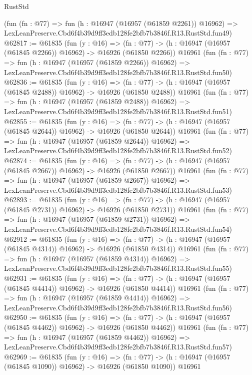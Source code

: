 \begin{lexlean}{RustStd}
\begin{coremodule}
    (fun (fn : @77) =>
    fun (h : @16947 (@16957 (@61859 @2261)) @16962) =>
    LexLeanPreserve.Cbd6f4b39d9ff3edb128fe2bfb7b3846f.R13.RustStd.fun49)
@62817 := @61835
    (fun (y : @16) =>
    (fn : @77) -> (h : @16947 (@16957 (@61845 @2266)) @16962) -> @16926 (@61850 @2266))
    @16961
    (fun (fn : @77) =>
    fun (h : @16947 (@16957 (@61859 @2266)) @16962) =>
    LexLeanPreserve.Cbd6f4b39d9ff3edb128fe2bfb7b3846f.R13.RustStd.fun50)
@62836 := @61835
    (fun (y : @16) =>
    (fn : @77) -> (h : @16947 (@16957 (@61845 @2488)) @16962) -> @16926 (@61850 @2488))
    @16961
    (fun (fn : @77) =>
    fun (h : @16947 (@16957 (@61859 @2488)) @16962) =>
    LexLeanPreserve.Cbd6f4b39d9ff3edb128fe2bfb7b3846f.R13.RustStd.fun51)
@62855 := @61835
    (fun (y : @16) =>
    (fn : @77) -> (h : @16947 (@16957 (@61845 @2644)) @16962) -> @16926 (@61850 @2644))
    @16961
    (fun (fn : @77) =>
    fun (h : @16947 (@16957 (@61859 @2644)) @16962) =>
    LexLeanPreserve.Cbd6f4b39d9ff3edb128fe2bfb7b3846f.R13.RustStd.fun52)
@62874 := @61835
    (fun (y : @16) =>
    (fn : @77) -> (h : @16947 (@16957 (@61845 @2667)) @16962) -> @16926 (@61850 @2667))
    @16961
    (fun (fn : @77) =>
    fun (h : @16947 (@16957 (@61859 @2667)) @16962) =>
    LexLeanPreserve.Cbd6f4b39d9ff3edb128fe2bfb7b3846f.R13.RustStd.fun53)
@62893 := @61835
    (fun (y : @16) =>
    (fn : @77) -> (h : @16947 (@16957 (@61845 @2731)) @16962) -> @16926 (@61850 @2731))
    @16961
    (fun (fn : @77) =>
    fun (h : @16947 (@16957 (@61859 @2731)) @16962) =>
    LexLeanPreserve.Cbd6f4b39d9ff3edb128fe2bfb7b3846f.R13.RustStd.fun54)
@62912 := @61835
    (fun (y : @16) =>
    (fn : @77) -> (h : @16947 (@16957 (@61845 @4314)) @16962) -> @16926 (@61850 @4314))
    @16961
    (fun (fn : @77) =>
    fun (h : @16947 (@16957 (@61859 @4314)) @16962) =>
    LexLeanPreserve.Cbd6f4b39d9ff3edb128fe2bfb7b3846f.R13.RustStd.fun55)
@62931 := @61835
    (fun (y : @16) =>
    (fn : @77) -> (h : @16947 (@16957 (@61845 @4414)) @16962) -> @16926 (@61850 @4414))
    @16961
    (fun (fn : @77) =>
    fun (h : @16947 (@16957 (@61859 @4414)) @16962) =>
    LexLeanPreserve.Cbd6f4b39d9ff3edb128fe2bfb7b3846f.R13.RustStd.fun56)
@62950 := @61835
    (fun (y : @16) =>
    (fn : @77) -> (h : @16947 (@16957 (@61845 @4462)) @16962) -> @16926 (@61850 @4462))
    @16961
    (fun (fn : @77) =>
    fun (h : @16947 (@16957 (@61859 @4462)) @16962) =>
    LexLeanPreserve.Cbd6f4b39d9ff3edb128fe2bfb7b3846f.R13.RustStd.fun57)
@62969 := @61835
    (fun (y : @16) =>
    (fn : @77) -> (h : @16947 (@16957 (@61845 @1090)) @16962) -> @16926 (@61850 @1090))
    @16961

\end{coremodule}
\end{lexlean}
